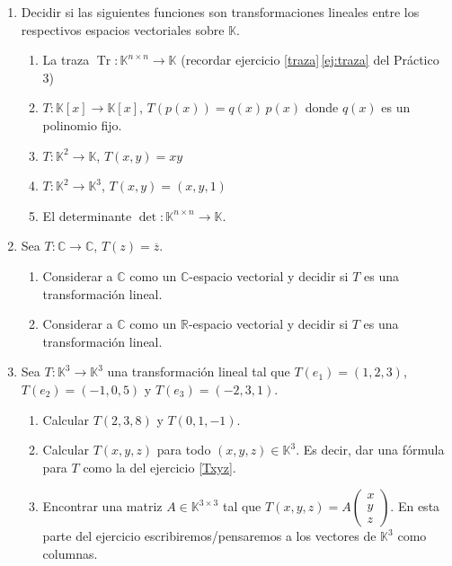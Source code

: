 \begin{enumerate}[topsep=6pt, itemsep=.4cm]
\item Decidir si las siguientes funciones son transformaciones lineales entre los respectivos espacios vectoriales sobre $\mathbb{K}$.
\begin{enumerate}[resume, topsep=5pt,itemsep=5pt]
 \item La traza $\operatorname{Tr}:\mathbb{K}^{n\times n}\longrightarrow\mathbb{K}$ (recordar ejercicio \ref{traza}\,\ref{ej:traza} del Práctico 3) 
 \item $T:\mathbb{K}[x]\longrightarrow\mathbb{K}[x]$, $T(p(x))=q(x)\,p(x)$ donde $q(x)$ es un polinomio fijo.
 \item $T:\mathbb{K}^2\longrightarrow\mathbb{K}$, $T(x,y)=xy$
 \item $T:\mathbb{K}^2\longrightarrow\mathbb{K}^3$, $T(x,y)=(x,y,1)$
 \item El determinante $\operatorname{det}:\mathbb{K}^{n\times n}\longrightarrow\mathbb{K}$.
\end{enumerate}


\item Sea $T:\mathbb{C}\longrightarrow\mathbb{C}$, $T(z)=\overline{z}$.
\begin{enumerate}
 \item Considerar a $\mathbb{C}$ como un $\mathbb{C}$-espacio vectorial y decidir si $T$ es una transformación lineal.
 \item Considerar a $\mathbb{C}$ como un $\mathbb{R}$-espacio vectorial y decidir si $T$ es una transformación lineal.
\end{enumerate}


\item\label{T en la base} Sea $T:\mathbb{K}^3\longrightarrow\mathbb{K}^3$ una transformación lineal tal que $T(e_1)=(1,2,3)$, $T(e_2)=(-1,0,5)$ y $T(e_3)=(-2,3,1)$. 
    \begin{enumerate}
     \item Calcular $T(2,3,8)$ y $T(0,1,-1)$. 
     \item\label{T en la base b} Calcular $T(x,y,z)$ para todo $(x,y,z)\in\mathbb{K}^3$. Es decir, dar una fórmula para $T$ como la del ejercicio \ref{Txyz}.
     \item\label{matriz otro}  Encontrar una matriz $A\in\mathbb{K}^{3\times3}$ tal que
     $T(x,y,z)=A\left(\begin{matrix}
    x\\y\\z \end{matrix}
    \right)$. En esta parte del ejercicio escribiremos/pensaremos a los vectores de $\mathbb{K}^3$ como columnas.
    \end{enumerate}


\end{enumerate}
